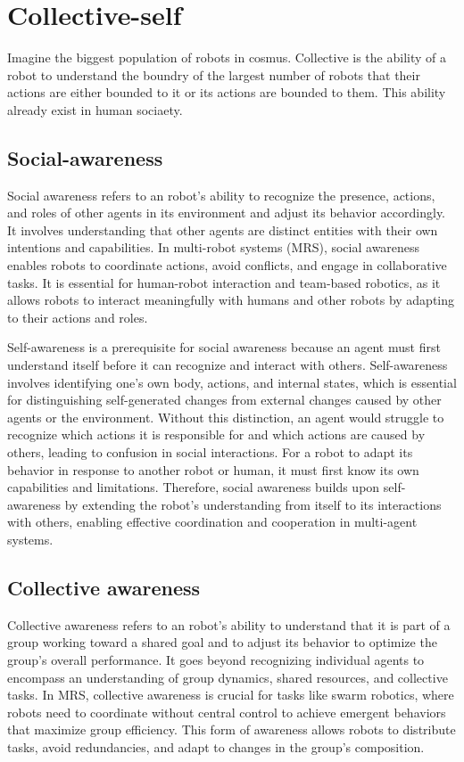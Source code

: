 \chapter{Collective-self}
Imagine the biggest population of robots in cosmus. Collective is the ability of a robot to understand the boundry of the largest number of robots that their actions are either bounded to it or its actions are bounded to them. This ability already exist in human sociaety.


\section{Social-awareness}
Social awareness refers to an robot's ability to recognize the presence, actions, and roles of other agents in its environment and adjust its behavior accordingly. It involves understanding that other agents are distinct entities with their own intentions and capabilities. In multi-robot systems (MRS), social awareness enables robots to coordinate actions, avoid conflicts, and engage in collaborative tasks. It is essential for human-robot interaction and team-based robotics, as it allows robots to interact meaningfully with humans and other robots by adapting to their actions and roles. 

Self-awareness is a prerequisite for social awareness because an agent must first understand itself before it can recognize and interact with others. Self-awareness involves identifying one’s own body, actions, and internal states, which is essential for distinguishing self-generated changes from external changes caused by other agents or the environment. Without this distinction, an agent would struggle to recognize which actions it is responsible for and which actions are caused by others, leading to confusion in social interactions. For a robot to adapt its behavior in response to another robot or human, it must first know its own capabilities and limitations. Therefore, social awareness builds upon self-awareness by extending the robot’s understanding from itself to its interactions with others, enabling effective coordination and cooperation in multi-agent systems.



\section{Collective awareness}
Collective awareness refers to an robot's ability to understand that it is part of a group working toward a shared goal and to adjust its behavior to optimize the group's overall performance. It goes beyond recognizing individual agents to encompass an understanding of group dynamics, shared resources, and collective tasks. In MRS, collective awareness is crucial for tasks like swarm robotics, where robots need to coordinate without central control to achieve emergent behaviors that maximize group efficiency. This form of awareness allows robots to distribute tasks, avoid redundancies, and adapt to changes in the group’s composition. 

